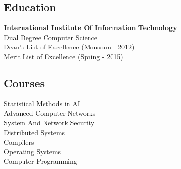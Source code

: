 \documentclass[letterpaper]{deedy-resume} %
\begin{document}
\begin{minipage}[t]{0.31\textwidth}
\subsection{Education} 
\textbf{International Institute Of Information Technology}\\
\textbullet{}Dual Degree Computer Science \\
\textbullet{}Dean's List of Excellence (Monsoon - 2012) \\
\textbullet{}Merit List of Excellence (Spring - 2015) \\
\sectionspace %

\subsection{Courses}
\textbullet{}Statistical Methods in AI \\
\textbullet{}Advanced Computer Networks \\
\textbullet{}System And Network Security \\
\textbullet{}Distributed Systems \\
\textbullet{}Compilers \\
\textbullet{}Operating Systems \\
\textbullet{}Computer Programming \\
\sectionspace %

\end{minipage} %
\hfill
%
%
\end{document}

